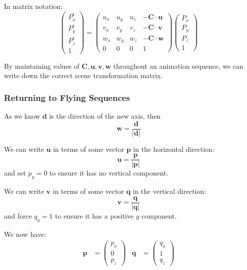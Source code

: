 \documentclass[11pt]{article}
\begin{document}
In matrix notation:
\[
  \begin{pmatrix} P_x^t \\ P_y^t \\ P_z^t \\ 1 \end{pmatrix}
  =
  \begin{pmatrix}
    u_x & u_y & u_z & -\textbf{C} \cdot \textbf{u} \\ 
    v_x & v_y & v_z & -\textbf{C} \cdot \textbf{v} \\ 
    w_x & w_y & w_z & -\textbf{C} \cdot \textbf{w} \\ 
    0 & 0 & 0 & 1
  \end{pmatrix}
  \begin{pmatrix} P_x \\ P_y \\ P_z \\ 1 \end{pmatrix}
\]

By maintaining values of $\textbf{C}, \textbf{u}, \textbf{v}, \textbf{w}$ throughout an animation sequence, we can write down the correct scene transformation matrix.

\subsubsection{Returning to Flying Sequences}
As we know $\textbf{d}$ is the direction of the new axis, then
\[
  \textbf{w} = \frac{\textbf{d}}{\lvert \textbf{d} \rvert}
\]

We can write $\textbf{u}$ in terms of some vector $\textbf{p}$ in the horizontal direction:
\[
  \textbf{u} = \frac{\textbf{p}}{\lvert \textbf{p} \rvert}
\]
and set $p_y = 0$ to ensure it has no vertical component.

We can write $\textbf{v}$ in terms of some vector $\textbf{q}$ in the vertical direction:
\[
  \textbf{v} = \frac{\textbf{q}}{\lvert \textbf{q} \rvert}
\]
and force $q_y = 1$ to ensure it has a positive $y$ component.

We now have:
\begin{align*}
  \textbf{p} &= \begin{pmatrix} p_x \\ 0 \\ p_z \end{pmatrix}
  & \textbf{q} &= \begin{pmatrix} q_x \\ 1 \\ q_z \end{pmatrix}
\end{align*}
\end{document}
